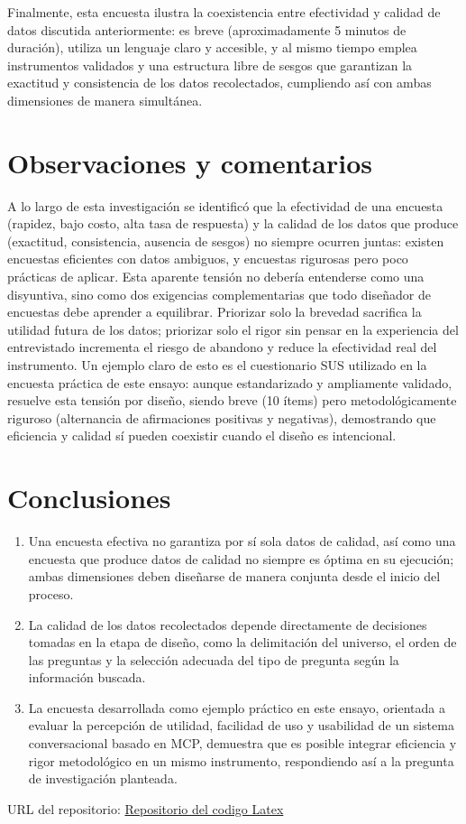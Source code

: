 \documentclass[12pt, letterpaper]{article}
\begin{document}
Finalmente, esta encuesta ilustra la coexistencia entre efectividad y calidad de datos discutida anteriormente: es breve (aproximadamente 5 minutos de duración), utiliza un lenguaje claro y accesible, y al mismo tiempo emplea instrumentos validados y una estructura libre de sesgos que garantizan la exactitud y consistencia de los datos recolectados, cumpliendo así con ambas dimensiones de manera simultánea.


\section*{Observaciones y comentarios}
A lo largo de esta investigación se identificó que la efectividad de una encuesta (rapidez, bajo costo, alta tasa de respuesta) y la calidad de los datos que produce (exactitud, consistencia, ausencia de sesgos) no siempre ocurren juntas: existen encuestas eficientes con datos ambiguos, y encuestas rigurosas pero poco prácticas de aplicar. Esta aparente tensión no debería entenderse como una disyuntiva, sino como dos exigencias complementarias que todo diseñador de encuestas debe aprender a equilibrar. Priorizar solo la brevedad sacrifica la utilidad futura de los datos; priorizar solo el rigor sin pensar en la experiencia del entrevistado incrementa el riesgo de abandono y reduce la efectividad real del instrumento. Un ejemplo claro de esto es el cuestionario SUS utilizado en la encuesta práctica de este ensayo: aunque estandarizado y ampliamente validado, resuelve esta tensión por diseño, siendo breve (10 ítems) pero metodológicamente riguroso (alternancia de afirmaciones positivas y negativas), demostrando que eficiencia y calidad sí pueden coexistir cuando el diseño es intencional.

\section*{Conclusiones}
\begin{enumerate}
    \item Una encuesta efectiva no garantiza por sí sola datos de calidad, así como una encuesta que produce datos de calidad no siempre es óptima en su ejecución; ambas dimensiones deben diseñarse de manera conjunta desde el inicio del proceso.

    \item La calidad de los datos recolectados depende directamente de decisiones tomadas en la etapa de diseño, como la delimitación del universo, el orden de las preguntas y la selección adecuada del tipo de pregunta según la información buscada.

    \item La encuesta desarrollada como ejemplo práctico en este ensayo, orientada a evaluar la percepción de utilidad, facilidad de uso y usabilidad de un sistema conversacional basado en MCP, demuestra que es posible integrar eficiencia y rigor metodológico en un mismo instrumento, respondiendo así a la pregunta de investigación planteada.
\end{enumerate}

\printbibliography{}

\vspace{1em}
\noindent URL del repositorio: \href{https://github.com/estiven-lg/seminario-de-tecnologias-de-informacion-22026-7690-047-A}{Repositorio del codigo Latex}
\end{document}
